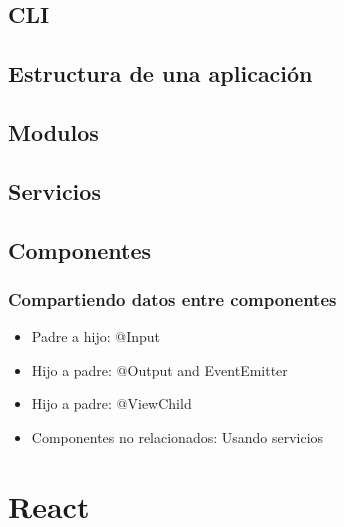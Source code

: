 \documentclass[12pt,article,oneside]{memoir}
\begin{document}
		\section{CLI}
	\newpage
	 	\section{Estructura de una aplicaci\'on}
	\newpage
		\section{Modulos}
	\newpage
		\section{Servicios}
	\newpage
		\section{Componentes}
			\subsection{Compartiendo datos entre componentes}
				\begin{itemize}
					\item Padre a hijo: @Input
					\item Hijo a padre: @Output and EventEmitter
					\item Hijo a padre: @ViewChild
					\item Componentes no relacionados: Usando servicios
				\end{itemize}
	\newpage
	
	\chapter{React}
	\newpage
	
\end{document}
